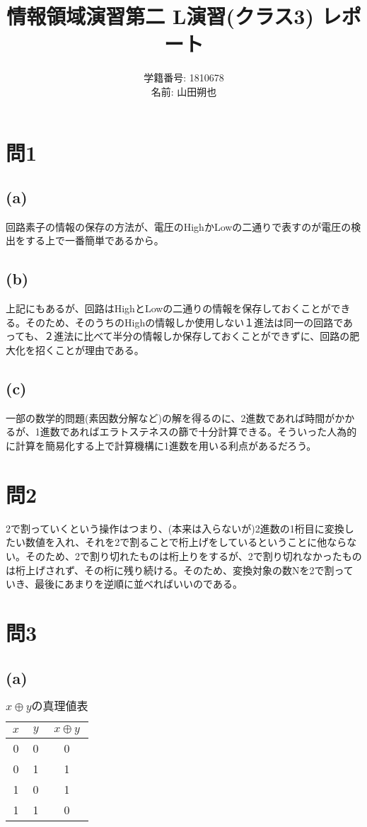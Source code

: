 \documentclass{jsarticle}
\title{情報領域演習第二 L演習(クラス3) レポート}
\author{学籍番号: 1810678 \\
        名前: 山田朔也}
\begin{document}
\maketitle
  \section{問1}
    \subsection{(a)}
    回路素子の情報の保存の方法が、電圧のHighかLowの二通りで表すのが電圧の検出をする上で一番簡単であるから。

    \subsection{(b)}
    上記にもあるが、回路はHighとLowの二通りの情報を保存しておくことができる。そのため、そのうちのHighの情報しか使用しない１進法は同一の回路であっても、２進法に比べて半分の情報しか保存しておくことができずに、回路の肥大化を招くことが理由である。

    \subsection{(c)}
    一部の数学的問題(素因数分解など)の解を得るのに、2進数であれば時間がかかるが、1進数であればエラトステネスの篩で十分計算できる。そういった人為的に計算を簡易化する上で計算機構に1進数を用いる利点があるだろう。

  \section{問2}
    2で割っていくという操作はつまり、(本来は入らないが)2進数の1桁目に変換したい数値を入れ、それを2で割ることで桁上げをしているということに他ならない。そのため、2で割り切れたものは桁上りをするが、2で割り切れなかったものは桁上げされず、その桁に残り続ける。そのため、変換対象の数Nを2で割っていき、最後にあまりを逆順に並べればいいのである。

  \section{問3}
    \subsection{(a)}
    \begin{table}[H]
      \caption{$x \oplus yの真理値表$}
      \label{tab:3_a}
      \centering
      \begin{tabular}{|c|c|c|} \hline
        $x$ & $y$ & $x \oplus y$ \\ \hline
        0 & 0 & 0 \\
        0 & 1 & 1 \\
        1 & 0 & 1 \\
        1 & 1 & 0 \\ \hline
      \end{tabular}
    \end{table}
\end{document}
